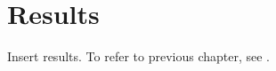 \section{Results}
\justify
Insert results. To refer to previous chapter, see \hyperref[sec:background]{}.